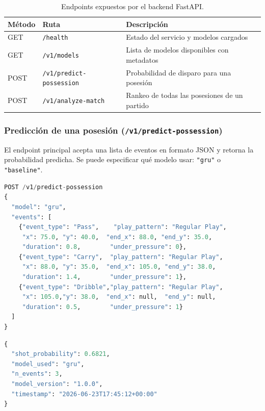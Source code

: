 \documentclass[12pt,a4paper]{article}
\newcommand{\code}[1]{\texttt{\small #1}}
\begin{document}
\begin{table}[H]
\centering
\caption{Endpoints expuestos por el backend FastAPI.}
\begin{tabularx}{\linewidth}{llX}
\toprule
\textbf{Método} & \textbf{Ruta} & \textbf{Descripción} \\
\midrule
GET  & \code{/health}                & Estado del servicio y modelos cargados \\
GET  & \code{/v1/models}             & Lista de modelos disponibles con metadatos \\
POST & \code{/v1/predict-possession} & Probabilidad de disparo para una posesión \\
POST & \code{/v1/analyze-match}      & Rankeo de todas las posesiones de un partido \\
\bottomrule
\end{tabularx}
\end{table}

\subsubsection{Predicción de una posesión (\texttt{/v1/predict-possession})}

El endpoint principal acepta una lista de eventos en formato JSON y retorna la
probabilidad predicha. Se puede especificar qué modelo usar: \code{"gru"} o
\code{"baseline"}.

\begin{lstlisting}[language=Python, caption={Request de predicción — ataque en campo rival bajo presión.}]
POST /v1/predict-possession
{
  "model": "gru",
  "events": [
    {"event_type": "Pass",    "play_pattern": "Regular Play",
     "x": 75.0, "y": 40.0,  "end_x": 88.0, "end_y": 35.0,
     "duration": 0.8,        "under_pressure": 0},
    {"event_type": "Carry",  "play_pattern": "Regular Play",
     "x": 88.0, "y": 35.0,  "end_x": 105.0, "end_y": 38.0,
     "duration": 1.4,        "under_pressure": 1},
    {"event_type": "Dribble","play_pattern": "Regular Play",
     "x": 105.0,"y": 38.0,  "end_x": null,  "end_y": null,
     "duration": 0.5,        "under_pressure": 1}
  ]
}
\end{lstlisting}

\begin{lstlisting}[language=Python, caption={Respuesta — probabilidad de disparo y metadatos.}]
{
  "shot_probability": 0.6821,
  "model_used": "gru",
  "n_events": 3,
  "model_version": "1.0.0",
  "timestamp": "2026-06-23T17:45:12+00:00"
}
\end{lstlisting}
\end{document}
